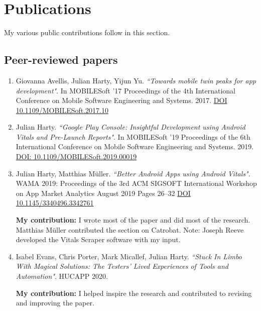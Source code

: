 \section{Publications}
My various public contributions follow in this section.

\subsection{Peer-reviewed papers}
\begin{enumerate}
    \item 	Giovanna Avellis, Julian Harty, Yijun Yu. \emph{``Towards mobile twin peaks for app development"}. In MOBILESoft '17 Proceedings of the 4th International Conference on Mobile Software Engineering and Systems. 2017. \href{https://doi.org/10.1109/MOBILESoft.2017.10}{DOI 10.1109/MOBILESoft.2017.10}~\cite{avellis_harty_yu_towards_mobile_twin_peaks}
    

    \item Julian Harty. \emph{``Google Play Console: Insightful Development using Android Vitals and Pre-Launch Reports"}. In MOBILESoft '19 Proceedings of the 6th International Conference on Mobile Software Engineering and Systems. 2019. \href{https://doi.org/10.1109/MOBILESoft.2019.00019}{DOI: 10.1109/MOBILESoft.2019.00019} ~\cite{harty_google_play_console_insightful_development_using_android_vitals_and_pre_launch_reports}
    
    \item Julian Harty, Matthias Müller. \emph{``Better Android Apps using Android Vitals"}.  WAMA 2019: Proceedings of the 3rd ACM SIGSOFT International Workshop on App Market Analytics August 2019 Pages 26–32 \href{https://doi.org/10.1145/3340496.3342761}{DOI 10.1145/3340496.3342761}~\cite{harty_better_android_apps_using_android_vitals}
    
    \textbf{My contribution:} I wrote most of the paper and did most of the research. Matthias Müller contributed the section on Catrobat. Note: Joseph Reeve developed the Vitals Scraper software with my input.
    
    \item Isabel Evans, Chris Porter, Mark Micallef, Julian Harty. \emph{``Stuck In Limbo With Magical Solutions: The Testers’ Lived Experiences of Tools and Automation"}. HUCAPP 2020. 
    
    \textbf{My contribution:} I helped inspire the research and contributed to revising and improving the paper.
    

\end{enumerate}
